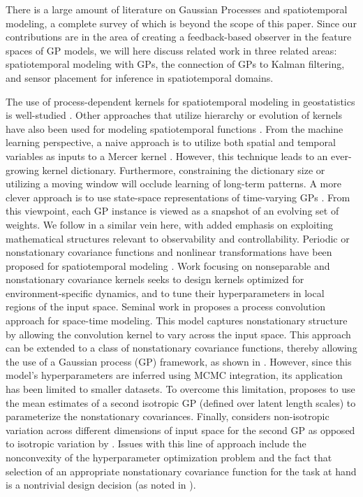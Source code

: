 \documentclass[letterpaper,12pt,peerreviewca,draftcls]{IEEEtran}
\begin{document}
There is a large amount of literature on Gaussian Processes and spatiotemporal modeling, a complete survey of which is beyond the scope of this paper. Since our contributions are in the area of creating a feedback-based observer in the feature spaces of GP models, we will here discuss  related work in three related areas: spatiotemporal modeling with GPs, the connection of GPs to Kalman filtering, and sensor placement for inference in spatiotemporal domains.
 
The use of process-dependent kernels for spatiotemporal modeling in geostatistics is well-studied \cite{wikle2002kernel,cressie2011statistics,stroud2001dynamic}. Other approaches that utilize hierarchy or evolution of kernels have also been used for modeling spatiotemporal functions \cite{hartikainen2013sequential,lindgren2011explicit,ho1996multiresolution}.
From the machine learning perspective, a naive approach is to utilize both spatial and temporal variables as inputs to a Mercer kernel \cite{perez2013gaussian}. However, this technique leads to an ever-growing kernel dictionary. %
Furthermore, constraining the dictionary size or utilizing a moving window will occlude learning of long-term patterns. A more clever approach is to use state-space representations of time-varying GPs \cite{sarkka2014convergence,hartikainen2013sequential}. From this viewpoint, each GP instance is viewed as a snapshot of an evolving set of weights. We follow in a similar vein here, with added emphasis on exploiting mathematical structures relevant to observability and controllability. Periodic or nonstationary covariance functions and nonlinear transformations have been proposed for spatiotemporal modeling \cite{ma2003nonstationary,RasmussenWilliams2005}. Work focusing on nonseparable and nonstationary covariance kernels seeks to design kernels optimized for environment-specific dynamics, and to tune their hyperparameters in local regions of the input space. Seminal work in \cite{higdon1998process} proposes a process convolution approach for space-time modeling. This model captures nonstationary structure by allowing the convolution kernel to vary across the input space. This approach can be extended to a class of nonstationary covariance functions, thereby allowing the use of a Gaussian process (GP) framework, as shown in \cite{paciorek2004nonstationary}. However,  since this model's hyperparameters are inferred using MCMC integration, its application has been limited to smaller datasets. To overcome this limitation, \cite{plagemann2008nonstationary} proposes to use the mean estimates of a second isotropic GP (defined over latent length scales) to parameterize the nonstationary covariances. Finally, \cite{garg2012AAAI} considers non-isotropic variation across different dimensions of input space for the second GP as opposed to isotropic variation by \cite{plagemann2008nonstationary}. Issues with this line of approach include the nonconvexity of the hyperparameter optimization problem and the fact that selection of an appropriate nonstationary covariance function for the task at hand is a nontrivial design decision (as noted in \cite{singh2010modeling}). 
\end{document}
